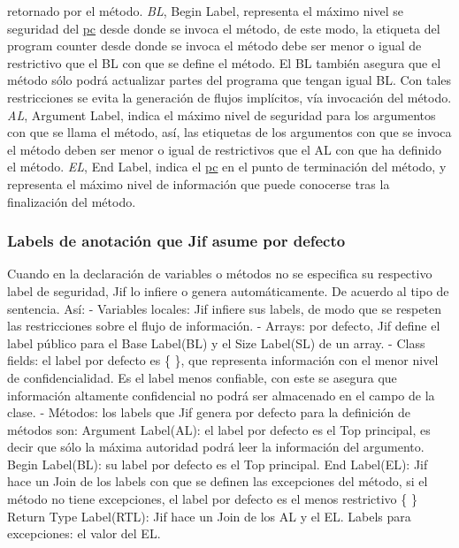 retornado por el método.\newline 
\emph{BL}, Begin Label, representa el máximo nivel se seguridad del
\underline{pc} desde donde se invoca el método, de este modo,
la etiqueta del program counter desde donde se invoca el método debe ser
menor o igual de restrictivo que el BL con que se define el método. El BL
también asegura que el método sólo podrá actualizar partes del programa que
tengan igual BL. Con tales restricciones se evita la generación de flujos
implícitos, vía invocación del método.\newline
\emph{AL}, Argument Label, indica el máximo nivel de seguridad para los
argumentos con que se llama el método, así, las etiquetas de los argumentos con
que se invoca el método deben ser menor o igual de restrictivos que el AL con que ha
definido el método.\newline 
\emph{EL}, End Label, indica el \underline{pc} en el punto de terminación del
método, y representa el máximo nivel de información que puede conocerse tras la
finalización del método.

\subsubsection{Labels de anotación que Jif asume por defecto}
\label{sssec:default-labels}
Cuando en la declaración de variables o métodos no se especifica su respectivo
label de seguridad, Jif lo infiere o genera automáticamente. De acuerdo al tipo
de sentencia. Así:\newline
- Variables locales: Jif infiere sus labels, de modo que se respeten las
restricciones sobre el flujo de información.\newline
- Arrays: por defecto, Jif define el label público para el Base Label(BL) y el
Size Label(SL) de un array.\newline
- Class fields: el label por defecto es \{ \}, que representa información con el
menor nivel de confidencialidad. Es el label menos confiable, con este se
asegura que información altamente confidencial no podrá ser almacenado en el
campo de la clase.\newline
- Métodos: los labels que Jif genera por defecto para la definición de
métodos son:\newline 
Argument Label(AL): el label por defecto es el Top principal, es decir que sólo
la máxima autoridad podrá leer la información del argumento.\newline 
Begin Label(BL): su label por defecto es el Top principal.\newline
End Label(EL): Jif hace un Join de los labels con que se definen las
excepciones del método, si el método no tiene excepciones, el label por defecto
es el menos restrictivo \{ \}\newline
Return Type Label(RTL): Jif hace un Join de los AL y el EL.\newline
Labels para excepciones: el valor del EL.

